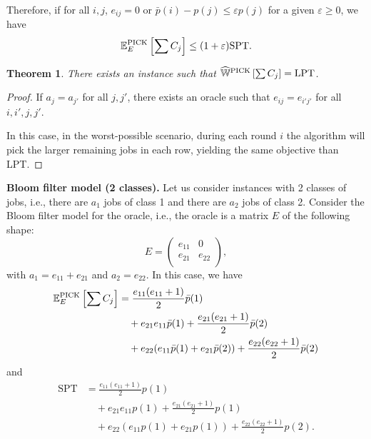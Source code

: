 \documentclass{article}
\newtheorem{theorem}{Theorem}
\begin{document}
Therefore, if for all \(i,j\), \(e_{ij}=0\) or \(\bar{p}(i)-p(j)\le\varepsilon p(j)\) for a given \(\varepsilon\ge 0\), we have
\[
    \mathbb{E}^{\text{PICK}}_E\left[\sum C_j\right]\le (1+\varepsilon)\text{SPT}.
\]


\begin{theorem}
    There exists an instance such that \(\widehat{\mathbb{W}}^{\text{PICK}}\left[\sum C_j\right]=\text{LPT}\).
\end{theorem}
\begin{proof}
    If \(a_j=a_{j'}\) for all \(j,j'\), there exists an oracle such that \(e_{ij}=e_{i'j'}\) for all \(i,i',j,j'\).

    In this case, in the worst-possible scenario, during each round \(i\) the algorithm will pick the larger remaining jobs in each row, yielding the same objective than LPT.
\end{proof}

\noindent\textbf{Bloom filter model (2 classes).}
Let us consider instances with 2 classes of jobs, i.e., there are \(a_1\) jobs of class 1 and there are \(a_2\) jobs of class 2.
Consider the Bloom filter model for the oracle, i.e., the oracle is a matrix \(E\) of the following shape:
\[
    E=\begin{pmatrix}
        e_{11} & 0 \\
        e_{21} & e_{22} \\
    \end{pmatrix},
\]
with \(a_1=e_{11}+e_{21}\) and \(a_2=e_{22}\).
In this case, we have
\begin{align*}
    \mathbb{E}_E^{\text{PICK}}\left[\sum C_j\right]
    &=\frac{e_{11}(e_{11}+1)}{2}\bar{p}(1) \\
    &\quad+e_{21}e_{11}\bar{p}(1)+\frac{e_{21}(e_{21}+1)}{2}\bar{p}(2) \\
    &\quad+e_{22}(e_{11}\bar{p}(1)+e_{21}\bar{p}(2))+\frac{e_{22}(e_{22}+1)}{2}\bar{p}(2)
\end{align*}
and
\begin{align*}
    \text{SPT}
    &=\frac{e_{11}(e_{11}+1)}{2}p(1) \\
    &\quad+e_{21}e_{11}p(1)+\frac{e_{21}(e_{21}+1)}{2}p(1) \\
    &\quad+e_{22}(e_{11}p(1)+e_{21}p(1))+\frac{e_{22}(e_{22}+1)}{2}p(2).
\end{align*}
\end{document}

